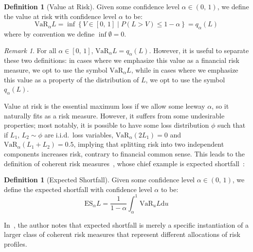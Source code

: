 \documentclass{amsart}
\theoremstyle{plain}
\theoremstyle{definition}
\newtheorem{definition}[subsubsection]{Definition}
\theoremstyle{definition}
\theoremstyle{remark}
\newtheorem{remark}[subsubsection]{Remark}
\begin{document}
\begin{definition}[Value at Risk]
    Given some confidence level \(\alpha \in \left(0,\,1\right)\), we define the value at risk with confidence level \(\alpha\) to be:
    \begin{equation*}
        \text{VaR}_{\alpha} L = \inf \left\{V \in \left[0,\,1\right] \mid P \left(L > V\right) \leq 1 - \alpha\right\} = q_{\alpha}\left(L\right)
    \end{equation*}
   where by convention we define \(\inf \emptyset = 0\).
\begin{remark}
    For all \(\alpha \in \left[0,\,1\right]\), \(\text{VaR}_{\alpha}L = q_{\alpha}\left(L\right)\). However, it is useful to separate these two definitions: in cases where we emphasize this value as a financial risk measure, we opt to use the symbol \(\text{VaR}_{\alpha}L\), while in cases where we emphasize this value as a property of the distribution of \(L\), we opt to use the symbol \(q_{\alpha}\left(L\right)\).
\end{remark}
    Value at risk is the essential maximum loss if we allow some leeway \(\alpha\), so it naturally fits as a risk measure. However, it suffers from some undesirable properties; most notably, it is possible to have some loss distribution \(\phi\) such that if \(L_{1},\,L_{2} \sim \phi\) are i.i.d.\ loss variables, \(\text{VaR}_{\alpha}(2L_{1}) = 0\) and \(\text{VaR}_{\alpha} \left(L_{1} + L_{2}\right) = 0.5\), implying that splitting risk into two independent components increases risk, contrary
    to financial common sense. This leads to the definition of coherent risk measures~\cite{A:artzner-et-al-1999}, whose chief example is expected shortfall~\cite{A:acerbi-and-tasche-2002}:

\end{definition}
\begin{definition}[Expected Shortfall]
   Given some confidence level \(\alpha \in \left(0,\,1\right)\), we define the expected shortfall with confidence level \(\alpha\) to be:
   \begin{equation*}
       \mathrm{ES}_{\alpha}L = \frac{1}{1-\alpha}\int_{\alpha}^{1} \text{VaR}_{u}L \mathrm{d}u
   \end{equation*}
\end{definition}

In~\cite{A:acerbi-2002}, the author notes that expected shortfall is merely a specific instantiation of a larger class of coherent risk measures that represent different allocations of risk profiles.
\end{document}
